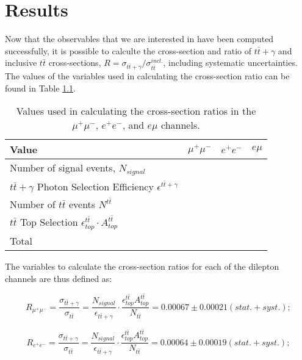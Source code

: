 \chapter{Results} \label{chap-Results}

Now that the observables that we are interested in have been computed successfully, it is possible to calculte the cross-section and ratio of $t\bar{t}+\gamma$ and inclusive $t\bar{t}$ cross-sections, $R = \sigma_{t\bar{t}+\gamma}/\sigma_{t\bar{t}}^{incl.}$, including systematic uncertainties. The values of the variables used in calculating the cross-section ratio can be found in Table \ref{tab-xsectvariables}.

\begin{table}[h!]
\begin{center}
\begin{tabular}{l|c|c|c}
\hline
	\textbf{Value} & $\mu^+\mu^-$ & $e^+e^-$ & $e\mu$ \\
\hline
	Number of signal events, $N_{signal}$ & & & \\
	$t\bar{t}+\gamma$ Photon Selection Efficiency $\epsilon^{t\bar{t}+\gamma}$ & & & \\
	Number of $t\bar{t}$ events $N^{t\bar{t}}$ & & & \\
	$t\bar{t}$ Top Selection $\epsilon^{t\bar{t}}_{top} \cdot A^{t\bar{t}}_{top}$ & & & \\
\hline
	Total & & & \\
\hline
\end{tabular} 
\end{center}
\caption{Values used in calculating the cross-section ratios in the $\mu^+\mu^-$, $e^+e^-$, and $e\mu$ channels.}
\label{tab-xsectvariables}
\end{table}

The variables to calculate the cross-section ratios for each of the dilepton channels are thus defined as:

\begin{equation}
	R_{\mu^+\mu^-} = \frac{\sigma_{t\bar{t}+\gamma}}{\sigma_{t\bar{t}}} = \frac{N_{signal}}{\epsilon_{t\bar{t}+\gamma}} \cdot \frac{\epsilon^{t\bar{t}}_{top} A^{t\bar{t}}_{top}}{N_{t\bar{t}}} = 0.00067 \pm 0.00021 (stat. + syst.);
\end{equation}

\begin{equation}
	R_{e^+e^-} = \frac{\sigma_{t\bar{t}+\gamma}}{\sigma_{t\bar{t}}} = \frac{N_{signal}}{\epsilon_{t\bar{t}+\gamma}} \cdot \frac{\epsilon^{t\bar{t}}_{top} A^{t\bar{t}}_{top}}{N_{t\bar{t}}} = 0.00064 \pm 0.00019 (stat. + syst.);
\end{equation}


